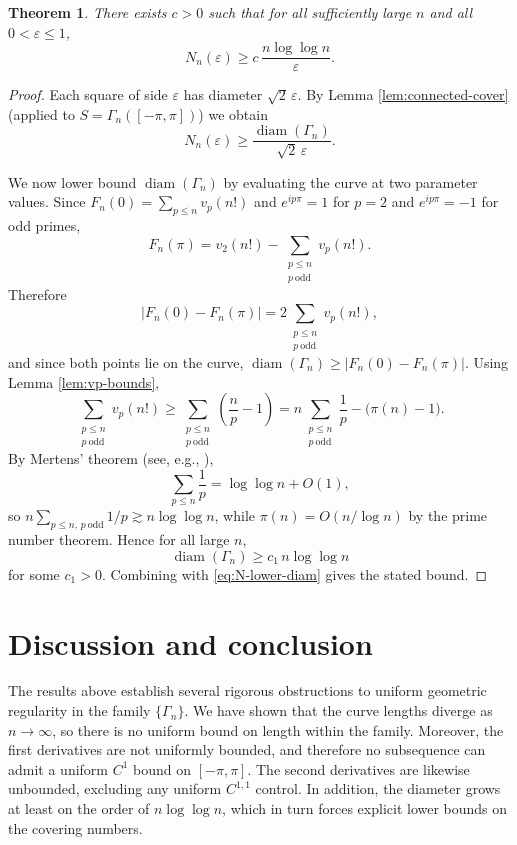 \documentclass[11pt]{article}
\theoremstyle{plain}
\newtheorem{theorem}{Theorem}[section]
\DeclareMathOperator{\diam}{diam}
\begin{document}
\begin{theorem}\label{thm:cover}
There exists $c>0$ such that for all sufficiently large $n$ and all $0<\varepsilon\le 1$,
\[
N_n(\varepsilon)\ge c\,\frac{n\log\log n}{\varepsilon}.
\]
\end{theorem}

\begin{proof}
Each square of side $\varepsilon$ has diameter $\sqrt{2}\,\varepsilon$.
By Lemma \ref{lem:connected-cover} (applied to $S=\Gamma_n([-\pi,\pi])$) we obtain
\begin{equation}\label{eq:N-lower-diam}
N_n(\varepsilon)\ge \frac{\diam(\Gamma_n)}{\sqrt{2}\,\varepsilon}.
\end{equation}

We now lower bound $\diam(\Gamma_n)$ by evaluating the curve at two parameter values.
Since $F_n(0)=\sum_{p\le n}v_p(n!)$ and $e^{ip\pi}=1$ for $p=2$ and $e^{ip\pi}=-1$ for odd primes,
\[
F_n(\pi)=v_2(n!)-\sum_{\substack{p\le n\\ p\ \mathrm{odd}}} v_p(n!).
\]
Therefore
\[
|F_n(0)-F_n(\pi)|
=
2\sum_{\substack{p\le n\\ p\ \mathrm{odd}}} v_p(n!),
\]
and since both points lie on the curve, $\diam(\Gamma_n)\ge |F_n(0)-F_n(\pi)|$.
Using Lemma \ref{lem:vp-bounds},
\[
\sum_{\substack{p\le n\\ p\ \mathrm{odd}}} v_p(n!)
\ge
\sum_{\substack{p\le n\\ p\ \mathrm{odd}}} \left(\frac{n}{p}-1\right)
=
n\sum_{\substack{p\le n\\ p\ \mathrm{odd}}}\frac{1}{p}
-\big(\pi(n)-1\big).
\]
By Mertens' theorem (see, e.g., \cite[Ch.~1]{Montgomery1994}),
\[
\sum_{p\le n}\frac{1}{p}=\log\log n + O(1),
\]
so $n\sum_{p\le n,\,p\ \mathrm{odd}}1/p \gtrsim n\log\log n$, while $\pi(n)=O(n/\log n)$ by the prime number theorem.
Hence for all large $n$,
\[
\diam(\Gamma_n)\ge c_1\,n\log\log n
\]
for some $c_1>0$.
Combining with \eqref{eq:N-lower-diam} gives the stated bound.
\end{proof}

\section{Discussion and conclusion}


The results above establish several rigorous obstructions to uniform geometric regularity in the family $\{\Gamma_n\}$. 
We have shown that the curve lengths diverge as $n\to\infty$, so there is no uniform bound on length within the family. 
Moreover, the first derivatives are not uniformly bounded, and therefore no subsequence can admit a uniform $C^1$ bound on $[-\pi,\pi]$. 
The second derivatives are likewise unbounded, excluding any uniform $C^{1,1}$ control. 
In addition, the diameter grows at least on the order of $n\log\log n$, which in turn forces explicit lower bounds on the covering numbers.
\end{document}
